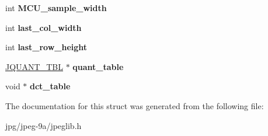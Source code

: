 \begin{DoxyCompactItemize}
\item 
\hypertarget{structjpeg__component__info_aca7e52dcd78bb2fe51104e2add9dade5}{int {\bfseries M\+C\+U\+\_\+sample\+\_\+width}}\label{structjpeg__component__info_aca7e52dcd78bb2fe51104e2add9dade5}

\item 
\hypertarget{structjpeg__component__info_a440612272e3e9eac0a240fd34cde5bbe}{int {\bfseries last\+\_\+col\+\_\+width}}\label{structjpeg__component__info_a440612272e3e9eac0a240fd34cde5bbe}

\item 
\hypertarget{structjpeg__component__info_a7d0738ae3647a019722410a2d718f3d3}{int {\bfseries last\+\_\+row\+\_\+height}}\label{structjpeg__component__info_a7d0738ae3647a019722410a2d718f3d3}

\item 
\hypertarget{structjpeg__component__info_afd551e8e9dbc3f3076c10cd4d391fdac}{\hyperlink{struct_j_q_u_a_n_t___t_b_l}{J\+Q\+U\+A\+N\+T\+\_\+\+T\+B\+L} $\ast$ {\bfseries quant\+\_\+table}}\label{structjpeg__component__info_afd551e8e9dbc3f3076c10cd4d391fdac}

\item 
\hypertarget{structjpeg__component__info_a9f68a39fc17561866668c1b9d4a8f238}{void $\ast$ {\bfseries dct\+\_\+table}}\label{structjpeg__component__info_a9f68a39fc17561866668c1b9d4a8f238}

\end{DoxyCompactItemize}


The documentation for this struct was generated from the following file\+:\begin{DoxyCompactItemize}
\item 
jpg/jpeg-\/9a/jpeglib.\+h\end{DoxyCompactItemize}
